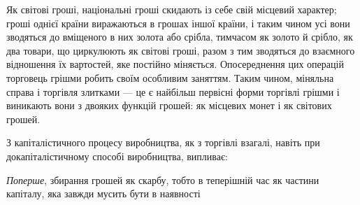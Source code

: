 Як світові гроші, національні гроші скидають із себе свій
місцевий характер; гроші однієї країни виражаються в грошах
іншої країни, і таким чином усі вони зводяться до вміщеного
в них золота або срібла, тимчасом як золото й срібло, як два
товари, що циркулюють як світові гроші, разом з тим зводяться
до взаємного відношення їх вартостей, яке постійно
міняється. Опосереднення цих операцій торговець грішми робить
своїм особливим заняттям. Таким чином, міняльна справа
і торгівля злитками — це є найбільш первісні форми торгівлі
грішми і виникають вони з двояких функцій грошей: як місцевих
монет і як світових грошей.

З капіталістичного процесу виробництва, як з торгівлі взагалі,
навіть при докапіталістичному способі виробництва, випливає:

\emph{Поперше}, збирання грошей як скарбу, тобто в теперішній
час як частини капіталу, яка завжди мусить бути в наявності
\parbreak{}  %
